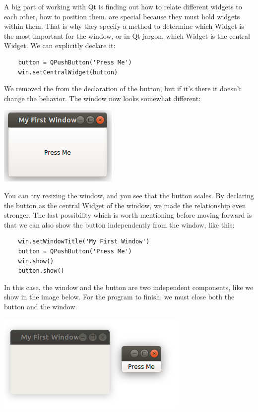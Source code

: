 A big part of working with Qt is finding out how to relate different widgets to each other, how to position them.  are special because they must hold widgets within them. That is why they specify a method to determine which Widget is the most important for the window, or in Qt jargon, which Widget is the central Widget. We can explicitly declare it:

\begin{verbatim}
    button = QPushButton('Press Me')
    win.setCentralWidget(button)
\end{verbatim}

We removed the  from the declaration of the button, but if it's there it doesn't change the behavior. The window now looks somewhat different:

\begin{center}
    \includegraphics[width=.3\textwidth]{images/Chapter_08/03_simple_window_and_central_widget.png}
\end{center}

You can try resizing the window, and you see that the button scales. By declaring the button as the central Widget of the window, we made the relationship even stronger. The last possibility which is worth mentioning before moving forward is that we can also show the button independently from the window, like this:

\begin{verbatim}
    win.setWindowTitle('My First Window')
    button = QPushButton('Press Me')
    win.show()
    button.show()
\end{verbatim}

In this case, the window and the button are two independent components, like we show in the image below. For the program to finish, we must close both the button and the window.

\begin{center}
    \includegraphics[width=.3\textwidth]{images/Chapter_08/04_window_button_separated.png}
\end{center}


